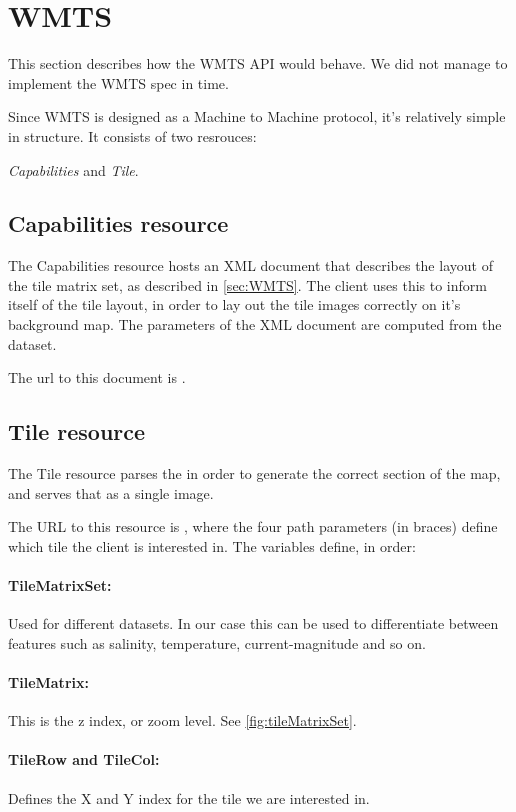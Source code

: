 \documentclass[11pt,a4paper,titlepage,oneside]{report}
\begin{document}
\section{WMTS}
This section describes how the \gls{WMTS} API would behave. We did not manage to implement the WMTS spec in time.

Since WMTS is designed as a Machine to Machine protocol, it's relatively simple in structure. It consists of two resrouces:

\textit{Capabilities} and \textit{Tile}. 
\subsection{Capabilities resource} 
The Capabilities resource hosts an XML document that describes the layout of the tile matrix set, as described in \ref{sec:WMTS}. The client uses this to inform itself of the tile layout, in order to lay out the tile images correctly on it's background map.  The parameters of the XML document are computed from the dataset.

The url to this document is .

\subsection{Tile resource}
The Tile resource parses the in order to generate the correct section of the map, and serves that as a single image.

The URL to this resource is , where the four path parameters (in braces) define which tile the client is interested in. The variables define, in order: 
\paragraph{TileMatrixSet: }
Used for different datasets. In our case this can be used to differentiate between features such as salinity, temperature, current-magnitude and so on.
\paragraph{TileMatrix: }
This is the z index, or zoom level. See \ref{fig:tileMatrixSet}.
\paragraph{TileRow and TileCol:}
Defines the X and Y index for the tile we are interested in.
\end{document}
